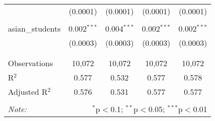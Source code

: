 \begin{table}[!htbp]
\begin{tabular}{@{\extracolsep{-2pt}}lcccc}
  & (0.0001) & (0.0001) & (0.0001) & (0.0001) \\ 
  & & & & \\ 
 asian\_students & 0.002$^{***}$ & 0.004$^{***}$ & 0.002$^{***}$ & 0.002$^{***}$ \\ 
  & (0.0003) & (0.0003) & (0.0003) & (0.0003) \\ 
  & & & & \\ 
\hline \\[-1.8ex] 
Observations & 10,072 & 10,072 & 10,072 & 10,072 \\ 
R$^{2}$ & 0.577 & 0.532 & 0.577 & 0.578 \\ 
Adjusted R$^{2}$ & 0.576 & 0.531 & 0.577 & 0.577 \\ 
\hline 
\hline \\[-1.8ex] 
\textit{Note:}  & \multicolumn{4}{r}{$^{*}$p$<$0.1; $^{**}$p$<$0.05; $^{***}$p$<$0.01} \\ 
\end{tabular} 
\end{table} 
